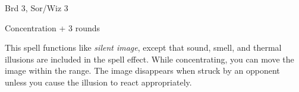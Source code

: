 
\begin{description*}
\item[Level:] Brd 3, Sor/Wiz 3
\item[Duration:] Concentration + 3 rounds
\end{description*}

This spell functions like \textit{silent image}, except that sound, smell, and
thermal illusions are included in the spell effect. While concentrating, you can
move the image within the range.
The image disappears when struck by an opponent unless you cause the illusion to
react appropriately.